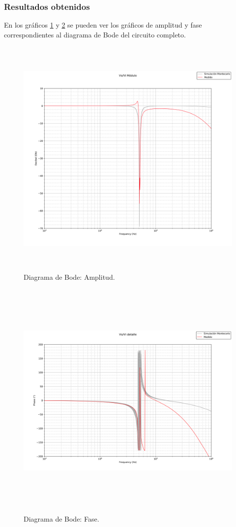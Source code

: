 \subsubsection{Resultados obtenidos}

En los gr\'aficos \ref{bode_mod} y  \ref{bode_ph} se pueden ver los gr\'aficos de amplitud y fase correspondientes al diagrama de Bode del circuito completo.

\begin{figure}[H] %
	\centering	\includegraphics[width=12cm,height=12cm,keepaspectratio]{../EJ4/graficos/BODE_BIEN.png}
	\caption{Diagrama de Bode: Amplitud.}
	\label{bode_mod}
\end{figure}


\begin{figure}[H] %
	\centering	\includegraphics[width=12cm,height=12cm,keepaspectratio]{../EJ4/graficos/phase_bode.png}
	\caption{Diagrama de Bode: Fase.}
	\label{bode_ph}
\end{figure}

